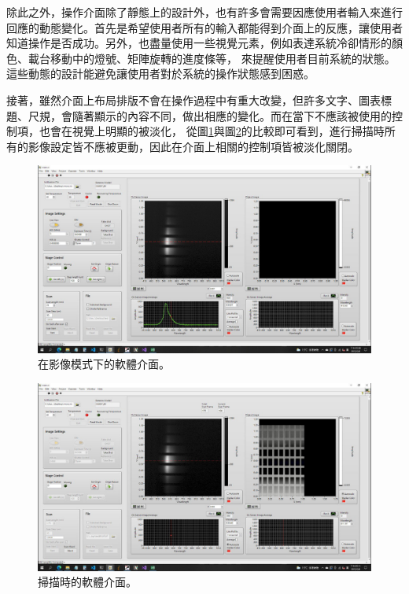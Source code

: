 \documentclass[12pt]{article}
\begin{document}
    除此之外，操作介面除了靜態上的設計外，也有許多會需要因應使用者輸入來進行回應的動態變化。首先是希望使用者所有的輸入都能得到介面上的反應，讓使用者知道操作是否成功。另外，也盡量使用一些視覺元素，例如表達系統冷卻情形的顏色、載台移動中的燈號、矩陣旋轉的進度條等，
    來提醒使用者目前系統的狀態。這些動態的設計能避免讓使用者對於系統的操作狀態感到困惑。

    接著，雖然介面上布局排版不會在操作過程中有重大改變，但許多文字、圖表標題、尺規，會隨著顯示的內容不同，做出相應的變化。而在當下不應該被使用的控制項，也會在視覺上明顯的被淡化，
    從圖\ref{figure: acquire mode}與圖\ref{figure: scanning}的比較即可看到，進行掃描時所有的影像設定皆不應被更動，因此在介面上相關的控制項皆被淡化關閉。
    \begin{figure}
        \centering
        \includegraphics[width=\linewidth]{acquire.jpeg}
        \caption{在影像模式下的軟體介面。}
        \label{figure: acquire mode}
    \end{figure}
    \begin{figure}
        \centering
        \includegraphics[width=\linewidth]{scanning.jpeg}
        \caption{掃描時的軟體介面。}
        \label{figure: scanning}
    \end{figure}
\end{document}
